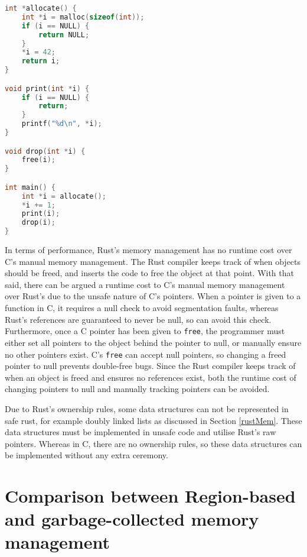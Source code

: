 \documentclass[10pt,a4paper,twocolumn]{article}
\begin{document}
\begin{lstlisting}[language=C, float=h, label=lst:cSafe, caption={A short safe C program to
	to allocate, increment, print and deallocate an integer.}]
int *allocate() {
	int *i = malloc(sizeof(int));
	if (i == NULL) {
		return NULL;
	}
	*i = 42;
	return i;
}

void print(int *i) {
	if (i == NULL) {
		return;
	}
	printf("%d\n", *i);
}

void drop(int *i) {
	free(i);
}

int main() {
	int *i = allocate();
	*i += 1;
	print(i);
	drop(i);
}
\end{lstlisting}

In terms of performance, Rust's memory management has no runtime cost over C's manual memory
management.
The Rust compiler keeps track of when objects should be freed, and inserts the code to free the
object at that point.
With that said, there can be argued a runtime cost to C's manual memory management over Rust's
due to the unsafe nature of C's pointers.
When a pointer is given to a function in C, it requires a null check to avoid segmentation faults,
whereas Rust's references are guaranteed to never be null, so can avoid this check.
Furthermore, once a C pointer has been given to \lstinline{free}, the programmer must either set
all pointers to the object behind the pointer to null, or manually ensure no other pointers exist.
C's \lstinline{free} can accept null pointers, so changing a freed pointer to null prevents
double-free bugs.
Since the Rust compiler keeps track of when an object is freed and ensures no references exist,
both the runtime cost of changing pointers to null and manually tracking pointers can be avoided.

Due to Rust's ownership rules, some data structures can not be represented in safe rust, for
example doubly linked lists as discussed in Section \ref{rustMem}.
These data structures must be implemented in unsafe code and utilise Rust's raw pointers.
Whereas in C, there are no ownership rules, so these data structures can be implemented without
any extra ceremony.

\section{Comparison between Region-based and garbage-collected memory management}
\end{document}
